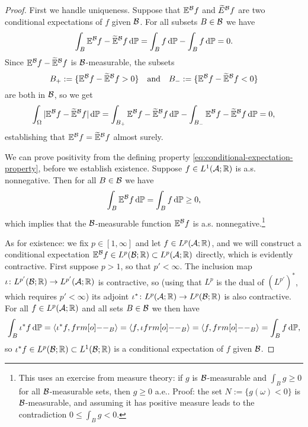 \begin{proof}
  First we handle uniqueness.
  Suppose that $\mathbb{E}^{\mathcal{B}}f$ and $\widetilde{E}^{\mathcal{B}}f$ are two conditional expectations of $f$ given $\mathcal{B}$.
  For all subsets $B \in \mathcal{B}$ we have
  \begin{equation*}
    \int_B \mathbb{E}^{\mathcal{B}}f - \widetilde{\mathbb{E}}^{\mathcal{B}}f \, \mathrm{d}\mathbb{P} = \int_B f \, \mathrm{d}\mathbb{P} - \int_B f \, \mathrm{d}\mathbb{P} = 0.
  \end{equation*}
  Since $\mathbb{E}^{\mathcal{B}}f - \widetilde{\mathbb{E}}^{\mathcal{B}}f$ is $\mathcal{B}$-measurable, the subsets
  \begin{equation*}
    B_+ := \{ \mathbb{E}^{\mathcal{B}}f - \widetilde{\mathbb{E}}^{\mathcal{B}}f > 0\} \quad \text{and} \quad B_- := \{\mathbb{E}^{\mathcal{B}}f - \widetilde{\mathbb{E}}^{\mathcal{B}}f < 0\}
  \end{equation*}
  are both in $\mathcal{B}$, so we get
  \begin{equation*}
    \int_\Omega |\mathbb{E}^{\mathcal{B}}f - \widetilde{\mathbb{E}}^{\mathcal{B}}f | \, \mathrm{d}\mathbb{P}
    = \int_{B_+}  \mathbb{E}^{\mathcal{B}}f - \widetilde{\mathbb{E}}^{\mathcal{B}}f \, \mathrm{d}\mathbb{P}
    -  \int_{B_-}  \mathbb{E}^{\mathcal{B}}f - \widetilde{\mathbb{E}}^{\mathcal{B}}f \, \mathrm{d}\mathbb{P}
    = 0,
  \end{equation*}
  establishing that $\mathbb{E}^{\mathcal{B}}f = \widetilde{\mathbb{E}}^{\mathcal{B}}f$ almost surely.

  We can prove positivity from the defining property \eqref{eq:conditional-expectation-property}, before we establish existence.
  Suppose $f \in L^1(\mathcal{A}; \mathbb{R})$ is a.s. nonnegative.
  Then for all $B \in \mathcal{B}$ we have
  \begin{equation*}
    \int_B \mathbb{E}^{\mathcal{B}} f \, \mathrm{d}\mathbb{P} = \int_B f \, \mathrm{d}\mathbb{P} \geq 0,
  \end{equation*}
  which implies that the $\mathcal{B}$-measurable function $\mathbb{E}^{\mathcal{B}}f$ is a.s. nonnegative.\footnote{This uses an exercise from measure theory: if $g$ is $\mathcal{B}$-measurable and $\int_B g \geq 0$ for all $\mathcal{B}$-measurable sets, then $g \geq 0$ a.e.. Proof: the set $N := \{g(\omega) < 0\}$ is $\mathcal{B}$-measurable, and assuming it has positive measure leads to the contradiction $0 \leq \int_B g < 0$.}

  As for existence: we fix $p \in [1,\infty]$ and let $f \in L^p(\mathcal{A};\mathbb{R})$, and we will construct a conditional expectation $\mathbb{E}^{\mathcal{B}}f \in L^p(\mathcal{B};\mathbb{R}) \subset L^p(\mathcal{A};\mathbb{R})$ directly, which is evidently contractive.
  First suppose $p > 1$, so that $p' < \infty$.
  The inclusion map $\iota \colon L^{p'}(\mathcal{B};\mathbb{R}) \rightarrow L^{p'}(\mathcal{A};\mathbb{R})$ is contractive, so (using that $L^p$ is the dual of $(L^{p'})^*$, which requires $p' < \infty$) its adjoint $\iota^* \colon L^p(\mathcal{A};\mathbb{R}) \rightarrow L^p(\mathcal{B};\mathbb{R})$ is also contractive.
  For all $f \in L^p(\mathcal{A};\mathbb{R})$ and all sets $B \in \mathcal{B}$ we then have
  \begin{equation*}
    \int_B \iota^* f \, \dd\P = \langle \iota^* f, \1_{B} \rangle = \langle f, \iota \1_{B} \rangle = \langle f, \1_{B} \rangle = \int_B f \, \dd\P,
  \end{equation*}
  so $\iota^* f \in L^p(\mathcal{B};\mathbb{R}) \subset L^1(\mathcal{B};\mathbb{R})$ is a conditional expectation of $f$ given $\mathcal{B}$.


\end{proof}
